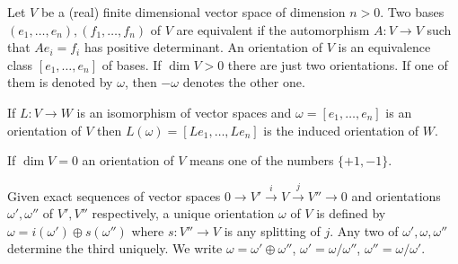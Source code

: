 Let $V$ be a (real) finite dimensional vector space of dimension $n > 0$. Two bases $(e_1, \ldots, e_n), (f_1, \ldots, f_n)$ of $V$ are equivalent if the automorphism $A: V \rightarrow V$ such that $Ae_i = f_i$ has positive determinant. An orientation of $V$ is an equivalence class $[e_1, \ldots, e_n]$ of bases. If $\dim V > 0$ there are just two orientations. If one of them is denoted by $\omega$, then $-\omega$ denotes the other one.

If $L: V \rightarrow W$ is an isomorphism of vector spaces and $\omega = [e_1, \ldots, e_n]$ is an orientation of $V$ then $L(\omega) = [Le_1, \ldots, Le_n]$ is the induced orientation of $W$.

If $\dim V = 0$ an orientation of $V$ means one of the numbers $\{+1, -1\}$.

Given exact sequences of vector spaces $0 \rightarrow V' \xrightarrow{i} V \xrightarrow{j} V'' \rightarrow 0$ and orientations $\omega', \omega''$ of $V', V''$ respectively, a unique orientation $\omega$ of $V$ is defined by $\omega = i(\omega') \oplus s(\omega'')$ where $s: V'' \rightarrow V$ is any splitting of $j$. Any two of $\omega', \omega, \omega''$ determine the third uniquely. We write $\omega = \omega' \oplus \omega''$, $\omega' = \omega/\omega''$, $\omega'' = \omega/\omega'$.
